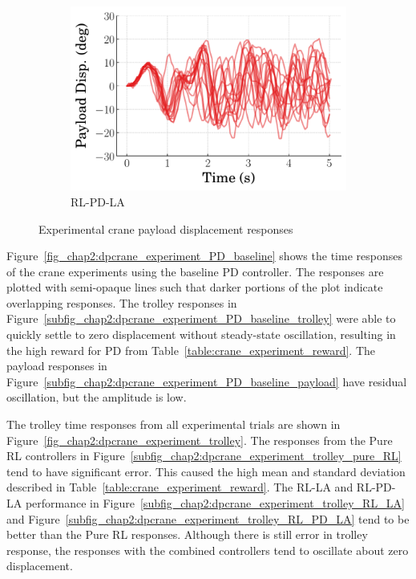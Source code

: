\begin{figure}[tb]
\begin{subfigure}[b]{0.49\textwidth}
        \centering
        \includegraphics[width=\textwidth]{figures/figures_RL_model_based_control/time_responses_crane_experiments/RL-PD-LA_payload_experiment.pdf}
        \caption{RL-PD-LA}
        \label{subfig_chap2:dpcrane_experiment_payload_RL_PD_LA}
    \end{subfigure}
    \hfill
    \caption{Experimental crane payload displacement responses}
    \label{fig_chap2:dpcrane_experiment_payload}
\end{figure}

Figure~\ref{fig_chap2:dpcrane_experiment_PD_baseline} shows the time responses of the crane experiments using the baseline PD controller. The responses are plotted with semi-opaque lines such that darker portions of the plot indicate overlapping responses. The trolley responses in Figure~\ref{subfig_chap2:dpcrane_experiment_PD_baseline_trolley} were able to quickly settle to zero displacement without steady-state oscillation, resulting in the high reward for PD from Table~\ref{table:crane_experiment_reward}. The payload responses in Figure~\ref{subfig_chap2:dpcrane_experiment_PD_baseline_payload} have residual oscillation,
but the amplitude is low.

The trolley time responses from all experimental trials are shown in Figure~\ref{fig_chap2:dpcrane_experiment_trolley}. The responses from the Pure RL controllers in Figure~\ref{subfig_chap2:dpcrane_experiment_trolley_pure_RL} tend to have significant error. This caused the high mean and standard deviation described in Table~\ref{table:crane_experiment_reward}.
%
The RL-LA and RL-PD-LA performance in Figure~\ref{subfig_chap2:dpcrane_experiment_trolley_RL_LA} and Figure~\ref{subfig_chap2:dpcrane_experiment_trolley_RL_PD_LA} tend to be better than the Pure RL responses. Although there is still error in trolley response, the responses with the combined controllers tend to oscillate about zero displacement.
%

